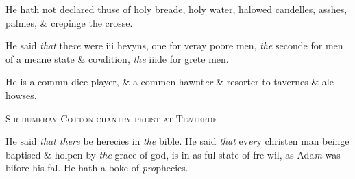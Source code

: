 \documentclass[12pt, a4paper]{book}
\begin{document}
				\marginpar[\vspace{0.5cm}{\textcolor{Gray}{ceremonies}}]{}
			
		\ifthenelse{\isodd{\thepage}}
		{\reversemarginpar}
		{\normalmarginpar}
		He hath not declared thuse of holy breade, holy water,
 halowed candelles, asshes, palmes, \& crepinge the crosse.

		\ifthenelse{\isodd{\thepage}}
		{\reversemarginpar}
		{\normalmarginpar}
		He said \textit{that} the\textit{re} were iii hevyns, one for veray poore men,
 \textit{the} seconde for men of a meane state \& co\textit{n}dition, \textit{the} iiide
 for grete men.

		\ifthenelse{\isodd{\thepage}}
		{\reversemarginpar}
		{\normalmarginpar}
		He is a commn dice player, \& a commen hawnt\textit{er} \& resorter
 to tavernes \& ale howses.
 

            
            	
				\begin{center} \begin{large} {\scshape Sir humfray Cotton chantry preist at Te\textit{n}terde
			} \end{large} \end{center}
			

 
		\ifthenelse{\isodd{\thepage}}
		{\reversemarginpar}
		{\normalmarginpar}
		He said \textit{that there} be herecies in \textit{the} bible.
 He said \textit{that} ev\textit{er}y christen man beinge baptised \& holpen
 by \textit{the} grace of god, is in as ful state of fre wil, as Ada\textit{m}
 was bifore his fal.
 He hath a boke of \textit{pro}phecies.
			


            
\dotfill
						\newpage {} \subsection*{}  \subsection*{}  \subsection*{}
\end{document}
